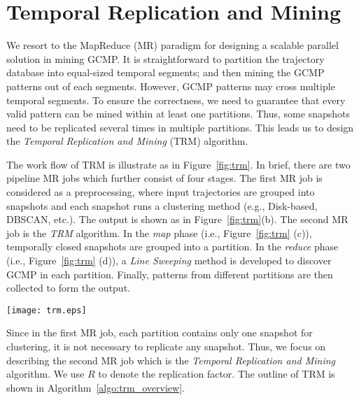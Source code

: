 \section{Temporal Replication and Mining}
\label{sec:trm}
We resort to the MapReduce (MR) paradigm for designing 
a scalable parallel solution in mining GCMP. It is straightforward 
to partition the trajectory database into equal-sized 
temporal segments; and then mining the GCMP patterns out of each segments. However, GCMP
patterns may cross multiple temporal segments. To ensure
the correctness, we need to guarantee that
every valid pattern can be mined within at least 
one partitions.
Thus, some snapshots need to be 
replicated several times in multiple partitions. This
leads us to design the \emph{Temporal Replication and Mining}
(TRM) algorithm.

The work flow of TRM is illustrate as in Figure~\ref{fig:trm}. 
In brief, there are two pipeline MR jobs which further consist of four stages. 
The first MR job is considered as a preprocessing, where input trajectories
are grouped into snapshots and each snapshot runs a clustering method (e.g., Disk-based, DBSCAN, etc.).
The output is shown as in Figure~\ref{fig:trm}(b). The second
MR job is the \emph{TRM} algorithm. In the \emph{map} phase 
(i.e., Figure~\ref{fig:trm} (c)), temporally closed snapshots are grouped
into a partition. In the \emph{reduce} phase (i.e., Figure~\ref{fig:trm} (d)),
a \emph{Line Sweeping} method is developed to discover GCMP in each partition. Finally,
patterns from different partitions are then collected to form the output.

\begin{figure*} [t]
\center
\texttt{[image: trm.eps]}
\caption{Work flow of Temporal Replication and Mining. (a)(b) correspond to the first MR job which computes the clusters at each snapshot; 
(c)(d) correspond to the second MR job which uses TRM to mine GCMP in parallel.}
\label{fig:trm}
\end{figure*}

Since in the first MR job, each partition contains only one snapshot
for clustering, it is not necessary to replicate any snapshot. Thus, we
focus on describing the second MR job which is the \emph{Temporal
Replication and Mining} algorithm. We use $R$ to denote the replication factor.
The outline of TRM is 
shown in Algorithm~\ref{algo:trm_overview}.

